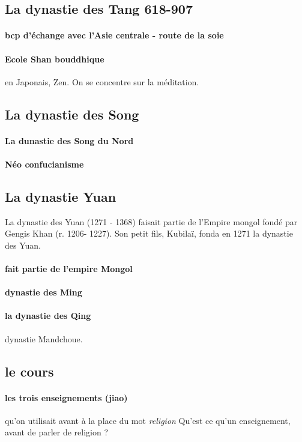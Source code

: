 \subsection{La dynastie des Tang 618-907}

\paragraph{bcp d'échange avec l'Asie centrale - route de la soie}

\paragraph{Ecole Shan bouddhique} en Japonais, Zen. On se concentre sur la méditation.


\subsection{La dynastie des Song}

\paragraph{La dunastie des Song du Nord}
 
\paragraph{Néo confucianisme}

\subsection{La dynastie Yuan} La dynastie des Yuan  (1271 - 1368) faisait partie de l’Empire mongol fondé par Gengis Khan (r. 1206- 1227). Son petit fils, Kubilaï, fonda en 1271 la dynastie des Yuan.

\paragraph{fait partie de l'empire Mongol}


\paragraph{dynastie des Ming}

\paragraph{la dynastie des Qing} dynastie Mandchoue. 


\subsection{le cours}

\paragraph{les trois enseignements (jiao)} qu'on utilisait avant à la place du mot \textit{religion}
Qu'est ce qu'un enseignement, avant de parler de religion ?




